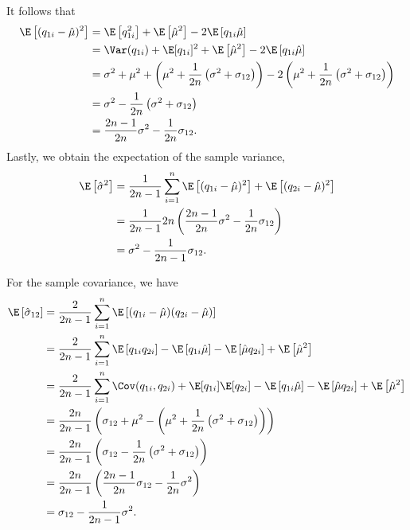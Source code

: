 \documentclass[11pt]{article}
\begin{document}
It follows that
\begin{align*}
  \E \left[ ( q_{1i} - \hat{\mu} )^2 \right]
  &=
    \E \left[ q_{1i}^2 \right] + \E \left[ \hat{\mu}^2 \right] - 2 \E \left[ q_{1i} \hat{\mu} \right]
  \\
  &=
    \Var( q_{1i} ) + \E[ q_{1i} ]^2
    + \E \left[ \hat{\mu} ^2 \right]
    - 2 \E \left[ q_{1i} \hat{\mu} \right]
  \\
  &=
    \sigma^2 + \mu^2
    + \left( \mu^2 + \frac{1}{2n} \left( \sigma^2 + \sigma_{12} \right) \right)
    - 2 \left( \mu^2 + \frac{1}{2n} \left( \sigma^2 + \sigma_{12} \right) \right)
  \\
  &=
    \sigma^2
    - \frac{1}{2n} \left( \sigma^2 + \sigma_{12} \right)
  \\
  &=
    \frac{2n-1}{2n} \sigma^2
    - \frac{1}{2n} \sigma_{12}
    .
\end{align*}
Lastly, we obtain the expectation of the sample variance,
\begin{align*}
  \E \left[ \hat{\sigma}^2 \right]
  &=
    \frac{1}{2n - 1} \sum_{i=1}^n \E \left[ ( q_{1i} - \hat{\mu} )^2 \right] + \E \left[ ( q_{2i} - \hat{\mu} )^2 \right] 
  \\
  &=
    \frac{1}{2n - 1} 2n \left( \frac{2n-1}{2n} \sigma^2 - \frac{1}{2n} \sigma_{12} \right)
  \\
  &=
    \sigma^2 - \frac{1}{2n - 1} \sigma_{12}
    .
\end{align*}

For the sample covariance, we have
\begin{align*}
  \E \left[ \hat{\sigma}_{12} \right]
  &=
    \frac{2}{2n - 1}\sum_{i=1}^n \E \left[ ( q_{1i} - \hat{\mu} )( q_{2i} - \hat{\mu} ) \right]
  \\
  &=
    \frac{2}{2n - 1} \sum_{i=1}^n
    \E \left[ q_{1i} q_{2i} \right]
    - \E \left[ q_{1i} \hat{\mu} \right]
    - \E \left[ \hat{\mu} q_{2i} \right]
    + \E \left[ \hat{\mu}^2 \right]
  \\
  &=
    \frac{2}{2n - 1} \sum_{i=1}^n
    \Cov ( q_{1i}, q_{2i} )
    + \E [ q_{1i} ] \E[ q_{2i} ]
    - \E \left[ q_{1i} \hat{\mu} \right]
    - \E \left[ \hat{\mu} q_{2i} \right]
    + \E \left[ \hat{\mu}^2 \right]
  \\
  &=
    \frac{2n}{2n - 1} \left(
    \sigma_{12}
    + \mu^2
    - \left( \mu^2 + \frac{1}{2n} \left( \sigma^2 + \sigma_{12} \right) \right)
    \right)
  \\
  &=
    \frac{2n}{2n - 1} \left(
    \sigma_{12}
    - \frac{1}{2n} \left( \sigma^2 + \sigma_{12} \right)
    \right)
  \\
  &=
    \frac{2n}{2n - 1} \left(
    \frac{2n-1}{2n} \sigma_{12}
    - \frac{1}{2n} \sigma^2
    \right)
  \\
  &=
    \sigma_{12}
    - \frac{1}{2n-1} \sigma^2
    .
\end{align*}
\end{document}
